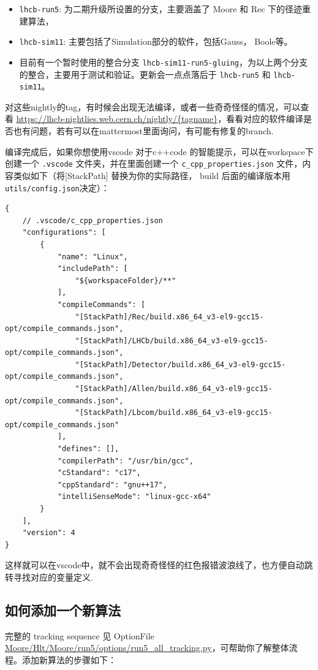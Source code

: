 \documentclass[UTF8]{article}
\begin{document}
\begin{itemize}
  \item \lstinline{lhcb-run5}: 为二期升级所设置的分支，主要涵盖了 Moore 和 Rec 下的径迹重建算法，
  \item \lstinline{lhcb-sim11}: 主要包括了Simulation部分的软件，包括Gauss， Boole等。
  \item 目前有一个暂时使用的整合分支 \lstinline{lhcb-sim11-run5-gluing}，为以上两个分支的整合，主要用于测试和验证。更新会一点点落后于 \lstinline{lhcb-run5} 和 \lstinline{lhcb-sim11}。
\end{itemize}

对这些nightly的tag，有时候会出现无法编译，或者一些奇奇怪怪的情况，可以查看 \url{https://lhcb-nightlies.web.cern.ch/nightly/{tagname}}，看看对应的软件编译是否也有问题，若有可以在mattermost里面询问，有可能有修复的branch.

编译完成后，如果你想使用vscode 对于c++code 的智能提示，可以在workspace下创建一个 \lstinline{.vscode} 文件夹，并在里面创建一个 \lstinline{c_cpp_properties.json} 文件，内容类似如下（将[StackPath] 替换为你的实际路径， build 后面的编译版本用\lstinline{utils/config.json}决定）：

\begin{lstlisting}[label=lst:vscode-cpp-config, caption={VS Code C++ 配置（\url{.vscode/c\_cpp\_properties.json}）}]
{
    // .vscode/c_cpp_properties.json
    "configurations": [
        {
            "name": "Linux",
            "includePath": [
                "${workspaceFolder}/**"
            ],
            "compileCommands": [
                "[StackPath]/Rec/build.x86_64_v3-el9-gcc15-opt/compile_commands.json",
                "[StackPath]/LHCb/build.x86_64_v3-el9-gcc15-opt/compile_commands.json",
                "[StackPath]/Detector/build.x86_64_v3-el9-gcc15-opt/compile_commands.json",
                "[StackPath]/Allen/build.x86_64_v3-el9-gcc15-opt/compile_commands.json",
                "[StackPath]/Lbcom/build.x86_64_v3-el9-gcc15-opt/compile_commands.json"
            ],
            "defines": [],
            "compilerPath": "/usr/bin/gcc",
            "cStandard": "c17",
            "cppStandard": "gnu++17",
            "intelliSenseMode": "linux-gcc-x64"
        }
    ],
    "version": 4
}
\end{lstlisting}

这样就可以在vscode中，就不会出现奇奇怪怪的红色报错波浪线了，也方便自动跳转寻找对应的变量定义.





\subsection{如何添加一个新算法}
完整的 tracking sequence 见 OptionFile \url{Moore/Hlt/Moore/run5/options/run5_all_tracking.py}，可帮助你了解整体流程。添加新算法的步骤如下：
\end{document}
